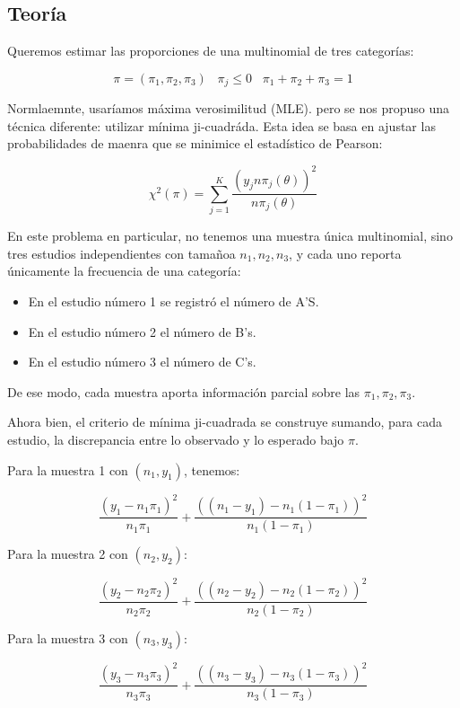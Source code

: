 
\subsection{Teoría}

Queremos estimar las proporciones de una multinomial de tres categorías:

\[
    \pi = (\pi_1, \pi_2, \pi_3) \;\;\; \pi_j \leq 0 \;\;\; \pi_1 + \pi_2 + \pi_3 = 1
\]

Normlaemnte, usaríamos máxima verosimilitud (MLE). pero se nos propuso una técnica diferente: utilizar
mínima ji-cuadráda. Esta idea se basa en ajustar las probabilidades de maenra que se minimice el estadístico
de Pearson:

\[
    \chi^2(\pi) = \sum_{j=1}^{K} \frac{(y_j  n \pi_j (\theta))^2}{n \pi_j (\theta)}
\]

En este problema en particular, no tenemos una muestra única multinomial, sino tres estudios independientes
con tamañoa $n_1, n_2, n_3$, y cada uno reporta únicamente la frecuencia de una categoría:

\begin{itemize}
    \item En el estudio número 1 se registró el número de A'S.
    \item En el estudio número 2 el número de B's.
    \item En el estudio número 3 el número de C's.
\end{itemize}

De ese modo, cada muestra aporta información parcial sobre las $\pi_1, \pi_2, \pi_3$. 

Ahora bien, el criterio de mínima ji-cuadrada se construye sumando, para cada estudio, la discrepancia
entre lo observado y lo esperado bajo $\pi$. 

Para la muestra 1 con $(n_1,y_1)$, tenemos:

\[
    \frac{(y_1 - n_1 \pi_1)^2}{n_1 \pi_1} + \frac{((n_1 - y_1) - n_1(1 - \pi_1))^2}{n_1(1 - \pi_1)}
\]

Para la muestra 2 con $(n_2, y_2)$:

\[
    \frac{(y_2 - n_2 \pi_2)^2}{n_2 \pi_2} + \frac{((n_2 - y_2) - n_2(1 - \pi_2))^2}{n_2(1 - \pi_2)}
\]

Para la muestra 3 con $(n_3, y_3)$:

\[
    \frac{(y_3 - n_3 \pi_3)^2}{n_3 \pi_3} + \frac{((n_3 - y_3) - n_3(1 - \pi_3))^2}{n_3(1 - \pi_3)}
\]

